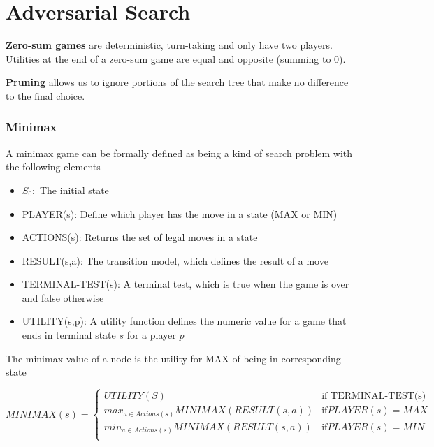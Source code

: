 \documentclass{article}
\begin{document}
\section{Adversarial Search}

\textbf{Zero-sum games} are deterministic, turn-taking and only have two players. Utilities at the end of a zero-sum game are equal and opposite (summing to 0). 

\textbf{Pruning} allows us to ignore portions of the search tree that make no difference to the final choice.
\subsubsection{Minimax}

A minimax game can be formally defined as being a kind of search problem with the following elements
\begin{itemize}
    \item $S_0:$ The initial state
    \item PLAYER(s): Define which player has the move in a state (MAX or MIN)
    \item ACTIONS(s): Returns the set of legal moves in a state
    \item RESULT(s,a): The transition model, which defines the result of a move
    \item TERMINAL-TEST(s): A terminal test, which is true when the game is over and false otherwise
    \item UTILITY(s,p): A utility function defines the numeric value for a game that ends in terminal state $s$ for a player $p$
\end{itemize}

The minimax value of a node is the utility for MAX of being in corresponding state

\begin{equation}
MINIMAX(s) =
    \begin{cases}
        UTILITY(S) & \text{if TERMINAL-TEST(s)} \\
        max_{a \in Actions(s)}MINIMAX(RESULT(s,a)) & \text{if} PLAYER(s) = MAX \\
        min_{a \in Actions(s)}MINIMAX(RESULT(s,a)) & \text{if} PLAYER(s) = MIN \\
            
    \end{cases}
\end{equation}
\end{document}
